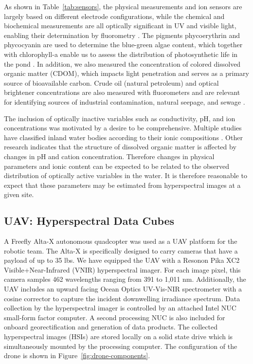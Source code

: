 \documentclass[remotesensing,article,submit,pdftex,moreauthors]{Definitions/mdpi}
\begin{document}
As shown in Table~\ref{tab:sensors}, the physical measurements and ion sensors are largely based on different electrode configurations, while the chemical and biochemical measurements are all optically significant in UV and visible light, enabling their determination by fluorometry \cite{de2007ion,trees2002fluorometric,tillman2017evaluation}. The pigments phycoerythrin and phycocyanin are used to determine the blue-green algae content, which together with chlorophyll-a enable us to assess the distribution of photosynthetic life in the pond \cite{Brient2008APP, boyer2009phytoplankton}. In addition, we also measured the concentration of colored dissolved organic matter (CDOM), which impacts light penetration and serves as a primary source of bioavailable carbon. Crude oil (natural petroleum) and optical brightener concentrations are also measured with fluorometers and are relevant for identifying sources of industrial contamination, natural seepage, and sewage \cite{brown2003review,cao2009evaluation}. 

The inclusion of optically inactive variables such as conductivity, pH, and ion concentrations was motivated by a desire to be comprehensive. Multiple studies have classified inland water bodies according to their ionic compositions \cite{piper1944graphic, dordoni2023preliminary}. Other research indicates that the structure of dissolved organic matter is affected by changes in pH and cation concentration\cite{pace2012ph}. Therefore changes in physical parameters and ionic content can be expected to be related to the observed distribution of optically active variables in the water. It is therefore reasonable to expect that these parameters may be estimated from hyperspectral images at a given site. 


\subsection{UAV: Hyperspectral Data Cubes}

A Freefly Alta-X autonomous quadcopter was used as a UAV platform for the robotic team. The Alta-X is specifically designed to carry cameras that have a payload of up to 35 lbs. We have equipped the UAV with a Resonon Pika XC2 Visible+Near-Infrared (VNIR) hyperspectral imager. For each image pixel, this camera samples 462 wavelengths ranging from 391 to 1,011 nm.  Additionally, the UAV includes an upward facing Ocean Optics UV-Vis-NIR spectrometer with a cosine corrector to capture the incident downwelling irradiance spectrum. Data collection by the hyperspectral imager is controlled by an attached Intel NUC small-form factor computer. A second processing NUC is also included for onboard georectification and generation of data products. The collected hyperspectral images (HSIs) are stored locally on a solid state drive which is simultaneously mounted by the processing computer. The configuration of the drone is shown in Figure~\ref{fig:drone-components}.
\end{document}
